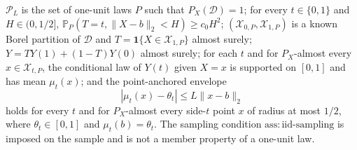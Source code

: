 \(\mathcal P_L\) is the set of one-unit laws \(P\) such that \(P_X(\mathcal D)=1\); for every \(t\in\{0,1\}\) and \(H\in(0,1/2]\), \(\mathbb P_P(T=t,\lVert X-b\rVert_2<H)\geq c_0H^2\); \((\mathcal X_{0,P},\mathcal X_{1,P})\) is a known Borel partition of \(\mathcal D\) and \(T=\mathbf1\{X\in\mathcal X_{1,P}\}\) almost surely; \(Y=TY(1)+(1-T)Y(0)\) almost surely; for each \(t\) and for \(P_X\)-almost every \(x\in\mathcal X_{t,P}\), the conditional law of \(Y(t)\) given \(X=x\) is supported on \([0,1]\) and has mean \(\mu_t(x)\); and the point-anchored envelope
\[
 |\mu_t(x)-\theta_t|\leq L\lVert x-b\rVert_2
\]
holds for every \(t\) and for \(P_X\)-almost every side-\(t\) point \(x\) of radius at most \(1/2\), where \(\theta_t\in[0,1]\) and \(\mu_t(b)=\theta_t\).  The sampling condition \(\mathrm{ass:iid\text{-}sampling}\) is imposed on the sample and is not a member property of a one-unit law.